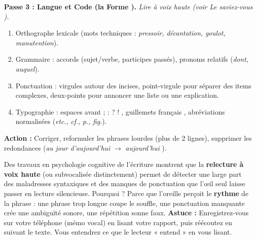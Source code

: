 \documentclass[11pt]{article}
\begin{document}
\begin{methode}
\textbf{Passe 3 : Langue et Code (la \og Forme \fg{}).} \emph{Lire à voix haute (voir \og Le saviez-vous \fg{}).}
\begin{enumerate}
    \item Orthographe lexicale (mots techniques : \emph{pressoir, décantation, goulot, manutention}).
    \item Grammaire : accords (sujet/verbe, participes passés), pronoms relatifs (\emph{dont, auquel}).
    \item Ponctuation : virgules autour des incises, point-virgule pour séparer des items complexes, deux-points pour annoncer une liste ou une explication.
    \item Typographie : espaces avant \og ; : ? ! \fg{}, guillemets français \og \fg{}, abréviations normalisées (\emph{etc., cf., p., fig.}).
\end{enumerate}
\textbf{Action :} Corriger, reformuler les phrases lourdes (plus de 2 lignes), supprimer les redondances (\og \emph{au jour d'aujourd'hui} \fg{} $\rightarrow$ \og \emph{aujourd'hui} \fg{}).
\end{methode}

\begin{savaistu}
Des travaux en psychologie cognitive de l'écriture montrent que la \textbf{relecture à voix haute} (ou subvocalisée distinctement) permet de détecter une large part des maladresses syntaxiques et des manques de ponctuation que l'œil seul laisse passer en lecture silencieuse. Pourquoi ? Parce que l'oreille perçoit le \textbf{rythme} de la phrase : une phrase trop longue coupe le souffle, une ponctuation manquante crée une ambiguïté sonore, une répétition sonne faux. \textbf{Astuce :} Enregistrez-vous sur votre téléphone (mémo vocal) en lisant votre rapport, puis réécoutez en suivant le texte. Vous entendrez ce que le lecteur « entend » en vous lisant.
\end{savaistu}
\end{document}
